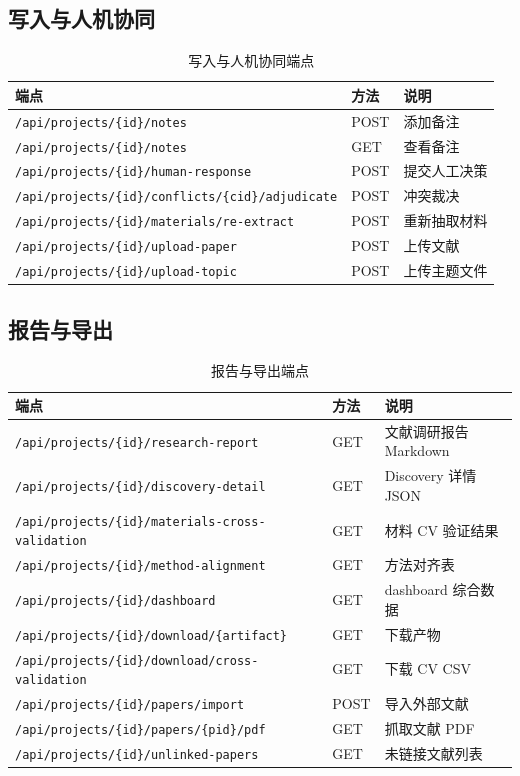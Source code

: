 \documentclass[11pt,a4paper]{article}
\begin{document}
\subsection{写入与人机协同}

\begin{table}[h]
\centering
\small
\caption{写入与人机协同端点}
\begin{tabular}{@{}p{6cm}p{2.5cm}p{5cm}@{}}
\toprule
\textbf{端点} & \textbf{方法} & \textbf{说明} \\
\midrule
\texttt{/api/projects/\{id\}/notes} & POST & 添加备注 \\
\texttt{/api/projects/\{id\}/notes} & GET & 查看备注 \\
\texttt{/api/projects/\{id\}/human-response} & POST & 提交人工决策 \\
\texttt{/api/projects/\{id\}/conflicts/\{cid\}/adjudicate} & POST & 冲突裁决 \\
\texttt{/api/projects/\{id\}/materials/re-extract} & POST & 重新抽取材料 \\
\texttt{/api/projects/\{id\}/upload-paper} & POST & 上传文献 \\
\texttt{/api/projects/\{id\}/upload-topic} & POST & 上传主题文件 \\
\bottomrule
\end{tabular}
\end{table}

\subsection{报告与导出}

\begin{table}[h]
\centering
\small
\caption{报告与导出端点}
\begin{tabular}{@{}p{7cm}p{2.5cm}p{4.5cm}@{}}
\toprule
\textbf{端点} & \textbf{方法} & \textbf{说明} \\
\midrule
\texttt{/api/projects/\{id\}/research-report} & GET & 文献调研报告 Markdown \\
\texttt{/api/projects/\{id\}/discovery-detail} & GET & Discovery 详情 JSON \\
\texttt{/api/projects/\{id\}/materials-cross-validation} & GET & 材料 CV 验证结果 \\
\texttt{/api/projects/\{id\}/method-alignment} & GET & 方法对齐表 \\
\texttt{/api/projects/\{id\}/dashboard} & GET & dashboard 综合数据 \\
\texttt{/api/projects/\{id\}/download/\{artifact\}} & GET & 下载产物 \\
\texttt{/api/projects/\{id\}/download/cross-validation} & GET & 下载 CV CSV \\
\texttt{/api/projects/\{id\}/papers/import} & POST & 导入外部文献 \\
\texttt{/api/projects/\{id\}/papers/\{pid\}/pdf} & GET & 抓取文献 PDF \\
\texttt{/api/projects/\{id\}/unlinked-papers} & GET & 未链接文献列表 \\
\bottomrule
\end{tabular}
\end{table}
\end{document}
